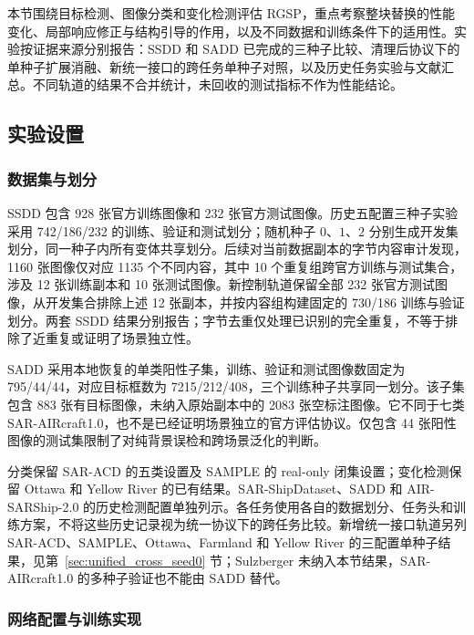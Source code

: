 \documentclass[journal]{IEEEtran}
\begin{document}
本节围绕目标检测、图像分类和变化检测评估 RGSP，重点考察整块替换的性能变化、局部响应修正与结构引导的作用，以及不同数据和训练条件下的适用性。实验按证据来源分别报告：SSDD 和 SADD 已完成的三种子比较、清理后协议下的单种子扩展消融、新统一接口的跨任务单种子对照，以及历史任务实验与文献汇总。不同轨道的结果不合并统计，未回收的测试指标不作为性能结论。

\subsection{实验设置}
\label{sec:experimental_settings}

\subsubsection{数据集与划分}
\label{sec:datasets}

SSDD 包含 928 张官方训练图像和 232 张官方测试图像\cite{ssdd2017,ssdd2021}。历史五配置三种子实验采用 742/186/232 的训练、验证和测试划分；随机种子 $0$、$1$、$2$ 分别生成开发集划分，同一种子内所有变体共享划分。后续对当前数据副本的字节内容审计发现，1160 张图像仅对应 1135 个不同内容，其中 10 个重复组跨官方训练与测试集合，涉及 12 张训练副本和 10 张测试图像。新控制轨道保留全部 232 张官方测试图像，从开发集合排除上述 12 张副本，并按内容组构建固定的 730/186 训练与验证划分。两套 SSDD 结果分别报告；字节去重仅处理已识别的完全重复，不等于排除了近重复或证明了场景独立性。

SADD 采用本地恢复的单类阳性子集，训练、验证和测试图像数固定为 795/44/44，对应目标框数为 7215/212/408，三个训练种子共享同一划分。该子集包含 883 张有目标图像，未纳入原始副本中的 2083 张空标注图像。它不同于七类 SAR-AIRcraft1.0，也不是已经证明场景独立的官方评估协议。仅包含 44 张阳性图像的测试集限制了对纯背景误检和跨场景泛化的判断。

分类保留 SAR-ACD 的五类设置及 SAMPLE 的 real-only 闭集设置；变化检测保留 Ottawa 和 Yellow River 的已有结果。SAR-ShipDataset、SADD 和 AIR-SARShip-2.0 的历史检测配置单独列示。各任务使用各自的数据划分、任务头和训练方案，不将这些历史记录视为统一协议下的跨任务比较。新增统一接口轨道另列 SAR-ACD、SAMPLE、Ottawa、Farmland 和 Yellow River 的三配置单种子结果，见第~\ref{sec:unified_cross_seed0} 节；Sulzberger 未纳入本节结果，SAR-AIRcraft1.0 的多种子验证也不能由 SADD 替代。

\subsubsection{网络配置与训练实现}
\label{sec:implementation_details}
\end{document}
